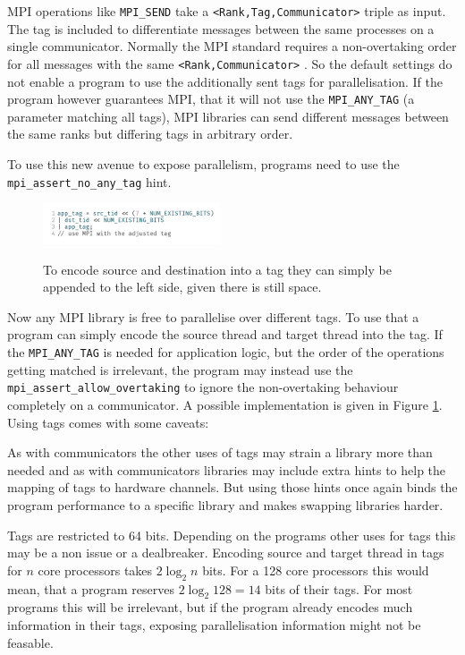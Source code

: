 \documentclass[sigconf]{acmart}
\begin{document}
MPI operations like \verb|MPI_SEND| take a \verb|<Rank,Tag,Communicator>| triple as input.
The tag is included to differentiate messages between the same processes on a single communicator.
Normally the MPI standard requires a non-overtaking order for all messages with the same \verb|<Rank,Communicator>| \cite{mpi40}.
So the default settings do not enable a program to use the additionally sent tags for parallelisation.
If the program however guarantees MPI, that it will not use the \verb|MPI_ANY_TAG| (a parameter matching all tags), MPI libraries can send different messages between the same ranks but differing tags in arbitrary order.

To use this new avenue to expose parallelism, programs need to use the \verb|mpi_assert_no_any_tag| hint.

\begin{figure}
    \caption{
        To encode source and destination into a tag they can simply be appended to the left side, given there is still space.
    }
    \includegraphics[width=0.47\textwidth]{Tags_CPP.png}
    \label{fig:Tags_CPP}
\end{figure}

Now any MPI library is free to parallelise over different tags.
To use that a program can simply encode the source thread and target thread into the tag.
If the \verb|MPI_ANY_TAG| is needed for application logic, but the order of the operations getting matched is irrelevant, the program may instead use the \verb|mpi_assert_allow_overtaking| to ignore the non-overtaking behaviour completely on a communicator.
A possible implementation is given in Figure \ref{fig:Tags_CPP}.
Using tags comes with some caveats:

As with communicators the other uses of tags may strain a library more than needed and as with communicators libraries may include extra hints to help the mapping of tags to hardware channels.
But using those hints once again binds the program performance to a specific library and makes swapping libraries harder.

Tags are restricted to 64 bits.
Depending on the programs other uses for tags this may be a non issue or a dealbreaker.
Encoding source and target thread in tags for $n$ core processors takes $2\log_2{n}$ bits.
For a 128 core processors this would mean, that a program reserves $2\log_2{128} = 14$ bits of their tags.
For most programs this will be irrelevant, but if the program already encodes much information in their tags, exposing parallelisation information might not be feasable.
\end{document}
